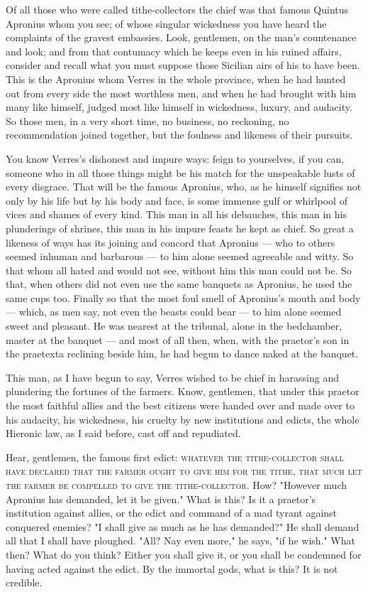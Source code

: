  Of all those who were called tithe-collectors the chief was that famous Quintus Apronius whom you see; of whose singular wickedness you have heard the complaints of the gravest embassies. Look, gentlemen, on the man's countenance and look; and from that contumacy which he keeps even in his ruined affairs, consider and recall what you must suppose those Sicilian airs of his to have been. This is the Apronius whom Verres in the whole province, when he had hunted out from every side the most worthless men, and when he had brought with him many like himself, judged most like himself in wickedness, luxury, and audacity. So those men, in a very short time, no business, no reckoning, no recommendation joined together, but the foulness and likeness of their pursuits.

 You know Verres's dishonest and impure ways: feign to yourselves, if you can, someone who in all those things might be his match for the unspeakable lusts of every disgrace. That will be the famous Apronius, who, as he himself signifies not only by his life but by his body and face, is some immense gulf or whirlpool of vices and shames of every kind. This man in all his debauches, this man in his plunderings of shrines, this man in his impure feasts he kept as chief. So great a likeness of ways has its joining and concord that Apronius --- who to others seemed inhuman and barbarous --- to him alone seemed agreeable and witty. So that whom all hated and would not see, without him this man could not be. So that, when others did not even use the same banquets as Apronius, he used the same cups too. Finally so that the most foul smell of Apronius's mouth and body --- which, as men say, not even the beasts could bear --- to him alone seemed sweet and pleasant. He was nearest at the tribunal, alone in the bedchamber, master at the banquet --- and most of all then, when, with the praetor's son in the praetexta reclining beside him, he had begun to dance naked at the banquet.

 This man, as I have begun to say, Verres wished to be chief in harassing and plundering the fortunes of the farmers. Know, gentlemen, that under this praetor the most faithful allies and the best citizens were handed over and made over to his audacity, his wickedness, his cruelty by new institutions and edicts, the whole Hieronic law, as I said before, cast off and repudiated.

 Hear, gentlemen, the famous first edict: \textsc{whatever the tithe-collector shall have declared that the farmer ought to give him for the tithe, that much let the farmer be compelled to give the tithe-collector}. How? "However much Apronius has demanded, let it be given." What is this? Is it a praetor's institution against allies, or the edict and command of a mad tyrant against conquered enemies? "I shall give as much as he has demanded?" He shall demand all that I shall have ploughed. "All? Nay even more," he says, "if he wish." What then? What do you think? Either you shall give it, or you shall be condemned for having acted against the edict. By the immortal gods, what is this? It is not credible.

